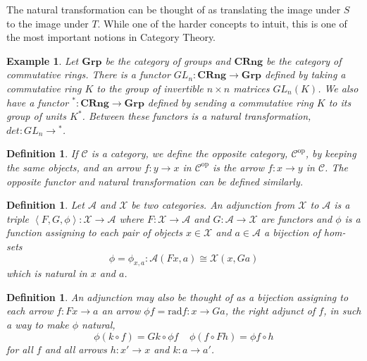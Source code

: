 \documentclass[12pt,a4paper]{article}
\newtheorem{example}[theorem]{Example}
\newtheorem{definition}[theorem]{Definition}
\newcommand\AL{\mathcal{A}}
\newcommand\CC{\mathcal{C}}
\newcommand\XX{\mathcal{X}}
\begin{document}
 The natural transformation can be thought of as translating the image under $S$ to the image under $T$.
 While one of the harder concepts to intuit, this is one of the most important notions in Category Theory.

 \begin{example}
     Let $\textbf{Grp}$ be the category of groups and $\textbf{CRng}$ be the category of commutative rings.
     There is a functor $GL_n:\textbf{CRng}\to\textbf{Grp}$ defined by taking a commutative ring $K$ to the group of invertible $n\times n$ matrices $GL_n(K)$.
     We also have a functor ${}^*:\textbf{CRng}\to\textbf{Grp}$ defined by sending a commutative ring $K$ to its group of units $K^*$.
     Between these functors is a natural transformation, $det:GL_n\to{}^*$.
     \begin{center}
     \end{center}   
 \end{example}

\begin{definition}
    If $\CC$ is a category, we define the opposite category, $\CC^\text{op}$, by keeping the same objects, and an arrow $f:y\to x$ in $\CC^\text{op}$ is the arrow $f:x\to y$ in $\CC$.
    The opposite functor and natural transformation can be defined similarly.
\end{definition}

\begin{definition}
    Let $\AL$ and $\mathcal{X}$ be two categories.
    An \textit{adjunction} from $\XX$ to $\AL$ is a triple $\left<F,G,\phi\right>:\XX\to\AL$ where $F:\XX\to\AL$ and $G:\AL\to\XX$ are functors and $\phi$ is a function assigning to each pair of objects $x\in\XX$ and $a\in\AL$ a bijection of hom-sets 
    \[
    \phi=\phi_{x,a}:\AL(Fx,a)\cong\XX(x,Ga)
    \]
    which is natural in $x$ and $a$.   
\end{definition}

\begin{definition}
    An adjunction may also be thought of as a bijection assigning to each arrow $f:Fx\to a$ an arrow $\phi f=\text{rad}f:x\to Ga$, the \textit{right adjunct of } $f$, in such a way to make $\phi$ natural, 
    \[
    \phi(k\circ f)=Gk\circ\phi f \;\;\;\; \phi(f\circ Fh)=\phi f\circ h
    \]
    for all $f$ and all arrows $h:x'\to x$ and $k:a\to a'$.
\end{definition}
\end{document}
